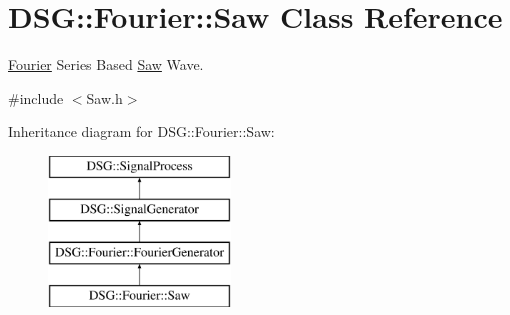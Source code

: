 \hypertarget{classDSG_1_1Fourier_1_1Saw}{\section{D\-S\-G\-:\-:Fourier\-:\-:Saw Class Reference}
\label{classDSG_1_1Fourier_1_1Saw}
}


\hyperlink{namespaceDSG_1_1Fourier}{Fourier} Series Based \hyperlink{classDSG_1_1Fourier_1_1Saw}{Saw} Wave.  




{\ttfamily \#include $<$Saw.\-h$>$}

Inheritance diagram for D\-S\-G\-:\-:Fourier\-:\-:Saw\-:\begin{figure}[H]
\begin{center}
\leavevmode
\includegraphics[height=4.000000cm]{classDSG_1_1Fourier_1_1Saw}
\end{center}
\end{figure}
